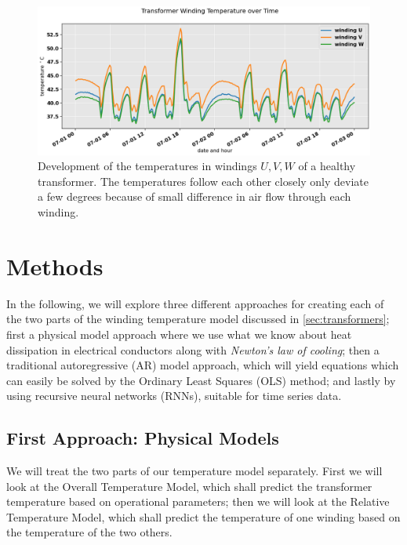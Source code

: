 \documentclass[]{article}
\begin{document}
\begin{figure}[!h]
	\centering
	\includegraphics[width=1\linewidth]{./figs/all-winding-temperature-over-time.png}
	\caption{Development of the temperatures in windings $U,V,W$ of a healthy transformer. The temperatures follow each other closely only deviate a few degrees because of small difference in air flow through each winding.}
	\label{fig:all-winding-temperature-over-time}
\end{figure}


\section{Methods} \label{sec:methods}

In the following, we will explore three different approaches for creating each of the two parts of the winding temperature model discussed in \ref{sec:transformers}; first a physical model approach where we use what we know about heat dissipation in electrical conductors along with \textit{Newton's law of cooling}; then a traditional autoregressive (AR) model approach, which will yield equations which can easily be solved by the Ordinary Least Squares (OLS) method; and lastly by using recursive neural networks (RNNs), suitable for time series data.

\subsection{First Approach: Physical Models} \label{sec:physical-model}
We will treat the two parts of our temperature model separately. First we will look at the Overall Temperature Model, which shall predict the transformer temperature based on operational parameters; then we will look at the Relative Temperature Model, which shall predict the temperature of one winding based on the temperature of the two others.
\end{document}
